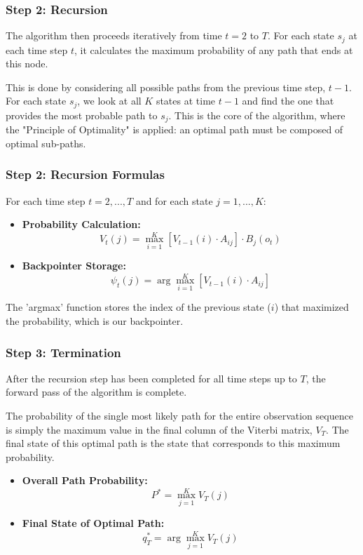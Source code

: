 \documentclass[aspectratio=43, 9pt]{beamer}
\begin{document}
\begin{frame}
    \frametitle{Step 2: Recursion}
    The algorithm then proceeds iteratively from time $t=2$ to $T$. For each state $s_j$ at each time step $t$, it calculates the maximum probability of any path that ends at this node.
    
    \vspace{1em}
    
    This is done by considering all possible paths from the previous time step, $t-1$. For each state $s_j$, we look at all $K$ states at time $t-1$ and find the one that provides the most probable path to $s_j$. This is the core of the algorithm, where the "Principle of Optimality" is applied: an optimal path must be composed of optimal sub-paths.
\end{frame}

\begin{frame}
    \frametitle{Step 2: Recursion Formulas}
    \begin{NewTheorem}
        For each time step $t = 2,..., T$ and for each state $j = 1,..., K$:
        \begin{itemize}
            \item \textbf{Probability Calculation:}
            $$V_t(j) = \max_{i=1}^K [V_{t-1}(i) \cdot A_{ij}] \cdot B_j(o_t)$$
            
            \item \textbf{Backpointer Storage:}
            $$\psi_t(j) = \arg\max_{i=1}^K [V_{t-1}(i) \cdot A_{ij}]$$
        \end{itemize}
    \end{NewTheorem}
    
    \vspace{1em}
    
    The 'argmax' function stores the index of the previous state ($i$) that maximized the probability, which is our backpointer.
\end{frame}

\begin{frame}
    \frametitle{Step 3: Termination}
    After the recursion step has been completed for all time steps up to $T$, the forward pass of the algorithm is complete.
    
    \vspace{1em}
    
    The probability of the single most likely path for the entire observation sequence is simply the maximum value in the final column of the Viterbi matrix, $V_T$. The final state of this optimal path is the state that corresponds to this maximum probability.
    
    \begin{NewTheorem}
        \begin{itemize}
            \item \textbf{Overall Path Probability:}
            $$P^* = \max_{j=1}^K V_T(j)$$
            
            \item \textbf{Final State of Optimal Path:}
            $$q_T^* = \arg\max_{j=1}^K V_T(j)$$
        \end{itemize}
    \end{NewTheorem}
\end{frame}
\end{document}

